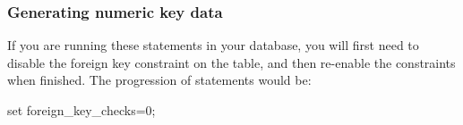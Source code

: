 \subsubsection*{Generating numeric key data}
\begin{tcolorbox}
    If you are running these statements in your database, you will first need to disable the foreign key constraint on the table, and then re-enable the constraints when finished. The progression of statements would be:

    \textsf{set foreign\_key\_checks=0;}
\end{tcolorbox}

